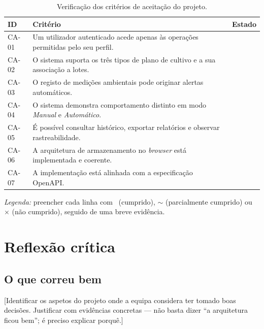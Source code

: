 \begin{table}[H]
\centering
\caption{Verificação dos critérios de aceitação do projeto.}
\label{tab:criterios}
\footnotesize
\renewcommand{\arraystretch}{1.4}
\begin{tabularx}{\linewidth}{l X c}
\toprule
\textbf{ID} & \textbf{Critério} & \textbf{Estado} \\
\midrule
CA-01 & Um utilizador autenticado acede apenas às operações permitidas pelo seu perfil. & \\
CA-02 & O sistema suporta os três tipos de plano de cultivo e a sua associação a lotes. & \\
CA-03 & O registo de medições ambientais pode originar alertas automáticos. & \\
CA-04 & O sistema demonstra comportamento distinto em modo \emph{Manual} e \emph{Automático}. & \\
CA-05 & É possível consultar histórico, exportar relatórios e observar rastreabilidade. & \\
CA-06 & A arquitetura de armazenamento no \emph{browser} está implementada e coerente. & \\
CA-07 & A implementação está alinhada com a especificação OpenAPI. & \\
\bottomrule
\end{tabularx}
\end{table}

\noindent
\textit{Legenda:} preencher cada linha com \checkmark\ (cumprido),
$\sim$ (parcialmente cumprido) ou $\times$ (não cumprido), seguido
de uma breve evidência.


\section{Reflexão crítica}
\label{sec:reflexao}


\subsection{O que correu bem}

[Identificar os aspetos do projeto onde a equipa considera ter
tomado boas decisões. Justificar com evidências concretas — não
basta dizer ``a arquitetura ficou bem''; é preciso explicar
porquê.]

